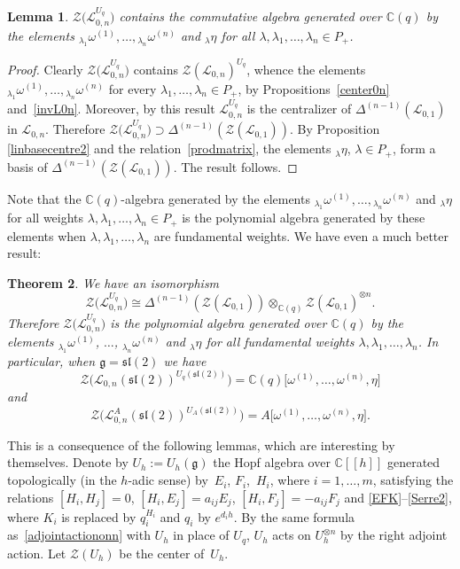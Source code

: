 \documentclass[pdftex]{sigma}%
\numberwithin{equation}{section}
\numberwithin{figure}{section}
\newtheorem{teo}{Theorem}[section]
\newtheorem{lem}[teo]{Lemma}
\newcommand{\mc}{\mathbb{C}}
\newcommand{\Ll}{{\mathcal L}}
\begin{document}
 \begin{lem} \label{center1lem} $\mathcal{Z}\big(\Ll_{0,n}^{U_q}\big)$ contains the commutative algebra generated over $\mc(q)$ by the elements ${}_{\lambda_1}\omega^{(1)},\dots, {}_{\lambda_n}\omega^{(n)}$ and ${}_\lambda\eta$ for all $\lambda,\lambda_1,\dots,\lambda_n\in P_+$.
\end{lem}

\begin{proof} Clearly $\mathcal{Z}\big(\Ll_{0,n}^{U_q}\big)$ contains $\mathcal{Z}(\Ll_{0,n})^{U_q}$, whence the elements ${}_{\lambda_1}\omega^{(1)},\dots, {}_{\lambda_n}\omega^{(n)}$ for every $\lambda_1,\dots,\lambda_n\in P_+$, by Propositions~\ref{center0n} and~\ref{invL0n}. Moreover, by this result $\Ll_{0,n}^{U_q}$ is the centralizer of $\Delta^{(n-1)}(\Ll_{0,1})$ in $\Ll_{0,n}$. Therefore $\mathcal{Z}\big(\Ll_{0,n}^{U_q}\big)\supset \Delta^{(n-1)}(\mathcal{Z}(\Ll_{0,1}))$. By Proposition \ref{linbasecentre2} and the relation~\eqref{prodmatrix}, the elements ${}_\lambda\eta$, $\lambda\in P_+$, form a basis of $\Delta^{(n-1)}(\mathcal{Z}(\Ll_{0,1}))$. The result follows. \end{proof}

Note that the $\mc(q)$-algebra generated by the elements ${}_{\lambda_1}\omega^{(1)},\dots, {}_{\lambda_n}\omega^{(n)}$ and ${}_\lambda\eta$ for all weights $\lambda,\lambda_1,\dots,\lambda_n\in P_+$ is the polynomial algebra generated by these elements when $\lambda,\lambda_1,\dots,\lambda_n$ are fundamental weights. We have even a much better result:
\begin{teo} \label{CenterLinv}
We have an isomorphism
\[
\mathcal{Z}\big(\Ll_{0,n}^{U_q}\big) \cong \Delta^{(n-1)}(\mathcal{Z}(\Ll_{0,1}))\otimes_{\mc(q)} \mathcal{Z}(\Ll_{0,1})^{\otimes n}.
\]
Therefore $\mathcal{Z}\big(\Ll_{0,n}^{U_q}\big)$ is the polynomial algebra generated over $\mc(q)$ by the elements ${}_{\lambda_1}\omega^{(1)}$, $\dots$, ${}_{\lambda_n}\omega^{(n)}$ and ${}_\lambda\eta$ for all fundamental weights $\lambda,\lambda_1,\dots,\lambda_n$. In particular, when $\mathfrak{g}={\mathfrak{sl}}(2)$ we have
\[
\mathcal{Z}\big(\Ll_{0,n}({\mathfrak{sl}}(2))^{U_q({\mathfrak{sl}}(2))}\big)= \mc(q)\big[\omega^{(1)},\dots,\omega^{(n)}, \eta\big]
\]
and
\[
\mathcal{Z}\big(\Ll_{0,n}^A({\mathfrak{sl}}(2))^{U_A({\mathfrak{sl}}(2))}\big)= A\big[\omega^{(1)},\dots,\omega^{(n)}, \eta\big].
\]
\end{teo}
This is a consequence of the following lemmas, which are interesting by themselves. Denote by $U_h := U_{h}(\mathfrak{g})$ the Hopf algebra over ${\mathbb C}[[h]]$ generated topologically (in the $h$-adic sense) by~$E_i$, $F_i$,~$H_i$, where $i=1,\dots,m$, satisfying the relations $[H_i, H_j]=0$, $[H_i, E_j]= a_{ij} E _j$, $[H_i, F_j]=- a_{ij}F_j$ and \eqref{EFK}--\eqref{Serre2}, where $K_i$ is replaced by $q_i^{H_i}$ and $q_i$ by $e^{d_ih}$. By the same formula as~\eqref{adjointactiononn} with $U_{h}$ in place of $U_q$, $U_{h}$ acts on $U_{h}^{\otimes n}$ by the right adjoint action. Let $\mathcal{Z}(U_{h})$ be the center of~$U_{h}$.
\end{document}
